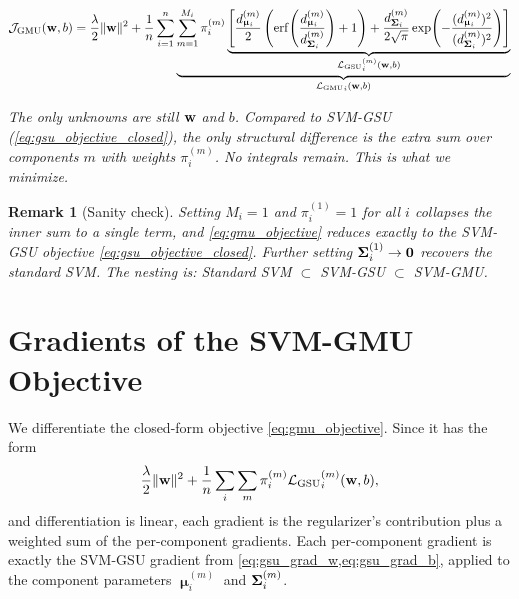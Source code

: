 \documentclass[11pt, letterpaper]{article}
\newcommand{\bSigma}{\vb{\Sigma}}
\newcommand{\bmu}{\boldsymbol{\upmu}}
\newcommand{\loss}{\mathcal{L}}
\newcommand{\obj}{\mathcal{J}}
\newtheorem{remark}{Remark}[section]
\begin{document}
\begin{statusbox}
\vspace{-0.5em}
\begin{equation*}
    \obj_{\text{GMU}}(\vb{w}, b) = \frac{\lambda}{2}\|\vb{w}\|^2
    + \frac{1}{n}\sum_{i=1}^{n}\underbrace{\sum_{m=1}^{M_i} \pi_i^{(m)}\underbrace{\left[\frac{d_{\bmu_i}^{(m)}}{2}\left(\mathrm{erf}\!\left(\frac{d_{\bmu_i}^{(m)}}{d_{\bSigma_i}^{(m)}}\right) + 1\right) + \frac{d_{\bSigma_i}^{(m)}}{2\sqrt{\pi}}\exp\!\left(-\frac{(d_{\bmu_i}^{(m)})^2}{(d_{\bSigma_i}^{(m)})^2}\right)\right]}_{{\loss_{\text{GSU}}}_{i}^{(m)}(\vb{w}, b)}}_{{\loss_{\text{GMU}}}_{i}(\vb{w}, b)}
\end{equation*}
\vspace{-1em}
\begin{center}\small
\emph{The only unknowns are still $\vb{w}$ and $b$. Compared to SVM-GSU (\cref{eq:gsu_objective_closed}), the only structural difference is the extra sum over components $m$ with weights $\pi_i^{(m)}$. No integrals remain. This is what we minimize.}
\end{center}
\end{statusbox}

\begin{remark}[Sanity check]
Setting $M_i = 1$ and $\pi_i^{(1)} = 1$ for all $i$ collapses the inner sum to a single term, and \cref{eq:gmu_objective} reduces exactly to the SVM-GSU objective \cref{eq:gsu_objective_closed}. Further setting $\bSigma_i^{(1)} \to \vb{0}$ recovers the standard SVM. The nesting is: Standard SVM $\subset$ SVM-GSU $\subset$ SVM-GMU.
\end{remark}

\section{Gradients of the SVM-GMU Objective}\label{sec:gmu_gradients}

We differentiate the closed-form objective \cref{eq:gmu_objective}. Since it has the form
\begin{equation*}
    \frac{\lambda}{2}\|\vb{w}\|^2 + \frac{1}{n}\sum_i \sum_m \pi_i^{(m)} {\loss_{\text{GSU}}}_{i}^{(m)}(\vb{w}, b),
\end{equation*}
and differentiation is linear, each gradient is the regularizer's contribution plus a weighted sum of the per-component gradients. Each per-component gradient is exactly the SVM-GSU gradient from \cref{eq:gsu_grad_w,eq:gsu_grad_b}, applied to the component parameters $\bmu_i^{(m)}$ and $\bSigma_i^{(m)}$.
\end{document}
